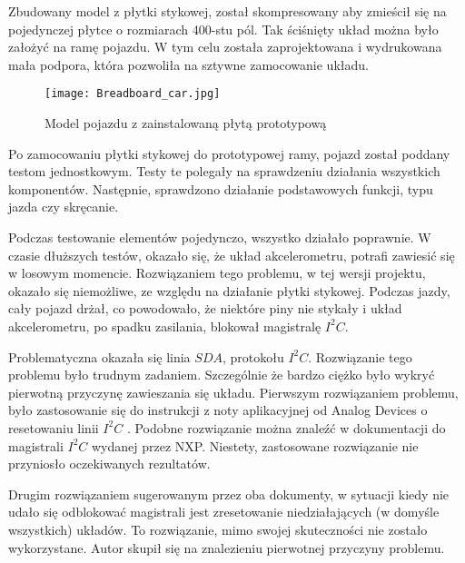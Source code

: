         Zbudowany model z płytki stykowej, został skompresowany aby zmieścił się na pojedynczej płytce o rozmiarach 400-stu pól.
        Tak ściśnięty układ można było założyć na ramę pojazdu.
        W tym celu została zaprojektowana i wydrukowana mała podpora, która pozwoliła na sztywne zamocowanie układu.
    
        \begin{figure}[!ht]
            \centering
            \texttt{[image: Breadboard\_car.jpg]}
            \caption{Model pojazdu z zainstalowaną płytą prototypową}
            \label{fig:breadboard_car}
        \end{figure}

        Po zamocowaniu płytki stykowej do prototypowej ramy, pojazd został poddany testom jednostkowym.
        Testy te polegały na sprawdzeniu działania wszystkich komponentów.
        Następnie, sprawdzono działanie podstawowych funkcji, typu jazda czy skręcanie.

        Podczas testowanie elementów pojedynczo, wszystko działało poprawnie.
        W czasie dłuższych testów, okazało się, że układ akcelerometru, potrafi zawiesić się w losowym momencie.
        Rozwiązaniem tego problemu, w tej wersji projektu, okazało się niemożliwe, ze względu na działanie płytki stykowej.
        Podczas jazdy, cały pojazd drżał, co powodowało, że niektóre piny nie stykały i układ akcelerometru, po spadku zasilania, blokował magistralę $I^2C$.
        
        Problematyczna okazała się linia $SDA$, protokołu $I^2C$. 
        Rozwiązanie tego problemu było trudnym zadaniem.
        Szczególnie że bardzo ciężko było wykryć pierwotną przyczynę zawieszania się układu.
        Pierwszym rozwiązaniem problemu, było zastosowanie się do instrukcji z noty aplikacyjnej od Analog Devices o resetowaniu linii $I^2C$ \cite{application_note_I2C_AD}.
        Podobne rozwiązanie można znaleźć w dokumentacji do magistrali $I^2C$ \cite{I2C_manual_NXP} wydanej przez NXP.
        Niestety, zastosowane rozwiązanie nie przyniosło oczekiwanych rezultatów.

        Drugim rozwiązaniem sugerowanym przez oba dokumenty, w sytuacji kiedy nie udało się odblokować magistrali jest zresetowanie niedziałających (w domyśle wszystkich) układów.
        To rozwiązanie, mimo swojej skuteczności nie zostało wykorzystane.
        Autor skupił się na znalezieniu pierwotnej przyczyny problemu.

